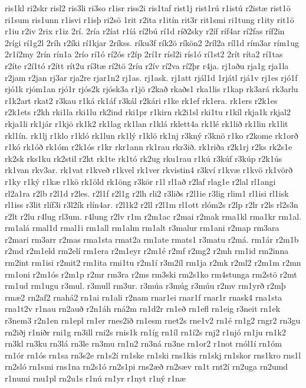 {ris1kl
ri2skr
risl2
ris3li
ri3so
r1isr
riss2i
ris1taf
rist1j
rist1rú
r1istú
r2istæ
rist1ö
ri1sum
ris1unn
r1isvi
r1isþ
ri2sö
1rit
r2ita
r1itín
rit3r
rit1smi
ri1tung
r1ity
rit1ö
r1iu
r2iv
2rix
r1iz
2rí.
2ría
r2íat
r1íá
rí2bú
rí1d
ríð2sky
r2íf
ríf4ar
rí2fas
ríf2in
2rígi
rí1g2l
2ríh
r2íki
rí1kjar
2ríkss.
ríku3f
rík2ö
ríkön2
2ríl2a
ríl1d
rím3ar
rím1ug
2r1í2my
2rín
rín1a
2río
rí1ó
rí2ós
r2íp
2rí1r
rísl2i
rís1ó
rí1st2
2rít
ríta2
rí1tas
r2íte
r2í1tó
r2ítt
rít2u
rí3tæ
rí2tö
2ríu
r2ív
rí2va
rí2þr
r4ja.
rj1aðu
rja1g
rja1la
r2jam
r2jan
rj3ar
rja2re
rjar1n2
rj1as.
rj1ask.
rj1att
rjál1d
1rjátl
rjá1v
rj1es
rjó1f
rjó1k
rjóm1an
rjó1r
rjós2k
rjósk3a
r1jö
r2kað
rkaðs1
rka1lis
r1kap
rk3ará
rk3arlu
r1k2art
rkat2
r3kau
r1ká
rk1áf
r3kál
r2kári
r1ke
rk1ef
rk1era.
rk1ers
r2k1es
r2k1ets
r2kh
rki1la
rki1lu
rk2ind
rki1pr
r1kirn
rk2i1sl
rki1tu
r1kíl
rkja1k
rkjal2
rkja1li
rk1jár
r1kjö
rk1k2
rk1lag
rk1lan
r1klá
rklett4a
rk1lé
rk1lið
rk1lin
rk1lit
rkl1ín.
rk1lj
r1klo
r1kló
rk1lun
rk1lý
r1klö
rk1nj
r3kný
r3knö
r1ko
r2kome
rk1orð
r1kó
rk1óð
rk1óm
r2k1ós
r1kr
rkr1ann
rk1rau
rkr3ið.
rk1riða
r2k1rj
r2ks
rk2s1e
rk2sk
rks1ku
rk2stil
r2kt
rk1te
rk1tó
rk2ug
rku1rau
r1kú
r3kúf
r3kúp
r2k1ús
rk1van
rkv3ar.
rk1vat
r1kveð
r1kvel
rk1ver
rkvistin4
r3kví
r1kvæ
r1kvö
rk1vörð
r1ky
r1ký
r1kæ
r1kö
rk1öld
rk1öng
r3kör
r1l
rl1að
r2laf
rlag1e
r2lal
rl1angi
rl2a1ra
r2lb
r2l1d
r2les.
r2l1f
r2l1g
r2lh
rli2
r3liðs
r2l1ie
r3lig
rlim1
rl1isi
rl1isk
rl1iss
r3lit
rlíf3i
r3l2ík
rlín4ar.
r2l1k2
r2ll
r2l1m
rl1ott
rlóm2s
r2lp
r2lr
r2ls
rl2s3n
r2lt
r2lu
r4lug
rl3um.
r4lung
r2lv
r1m
r2m1ac
r2mai
r2mak
rma1kl
rma1kr
rm1al.
rm1alá
rmal1d
rmal1i
rm1all
rm1alm
rm1alt
r3malur
rm1ani
r2map
rm3ara
r2mari
rm3arr
r2mas
rma1sta
rmat2a
rm1ate
rmats1
r3matu
r2má.
rm1ár
r2m1b
r2md
r2m1eld
rm2elí
rm1era
r2m1eyr
r2m1é
r2mf
r2mg2
r2mh
rm1id
rm2inna
rm2int
rm1isi
r2mit2
rm1ita
rmi1tu
r2m1í
r3m2íl
rm1ja
r2mk
r2ml2
r2m1m
r2mn
rm1oni
r2m1ós
r2m1p
r2mr
rm3ra
r2ms
rm3ski
rm2s1ko
rm4stunga
rm2stö
r2mt
rm1ud
rm1ugu
r3mul.
r3mull
rm3ur.
r3múa
r3múg
r3múu
r2mv
rm1yrð
r2mþ
rmæ2
rn2af2
rnahá2
rn1ai
rn1ali
r2nam
rnar1ei
rnar1f
rnar1r
rnask4
rna1sta
rna1t2v
r1nau
rn2auð
r2n1áh
rná2m
rn1d2r
rn1eð
rn1efl
rn1eig
r3neit
rn1ek
r3nem3
r2n1en
rn1epl
rn1er
rnes2ið
rn1esm
rnet2s
rne1v2
rn1é
rn1g2
rngr2
rn3gu
rn2iðj
r1niðr
rni1g
rn3ill
rni2s
rnis1k
rn1íg
rn1íl
rn1í2s
rnj2
r1njó
rn1ju
rn1k2
rn3kl
rn3ku
rn3lá
rn3le
rn3mu
rn1n2
rn3ná
rn3ne
rn1or2
r1not
rnól1í
rn1óm
rn1ór
rn1ós
rn1sa
rn3s2e
rn1s2í
rn1ske
rn1ski
rns1kis
rn1skj
rn1skor
rns1kro
rns1l
rn2sló
rn1smi
rns1na
rn2s1ó
rn2s1pi
rns2æð
rn2sæv
rn1t
rnt2í
rn2uga
rn2umd
r1numi
rnu1pl
rn2u1s
r1nú
rn1yr
r1nyt
r1ný
r1næ
}
